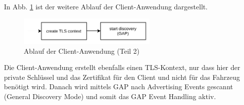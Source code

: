 \\\\
In Abb. \ref{fig: impl ablauf anwendung client teil 2} ist der weitere Ablauf der Client-Anwendung dargestellt.
\begin{figure}[H]
    \centering
    \includegraphics[width=0.6\textwidth]{graphics/ablauf_anwendung_teil_2_client.pdf}
    \caption[Ablauf der Client-Anwendung (Teil 2)]{Ablauf der Client-Anwendung (Teil 2)}
    \label{fig: impl ablauf anwendung client teil 2}
\end{figure}
Die Client-Anwendung erstellt ebenfalls einen TLS-Kontext, nur dass hier der private Schlüssel und das Zertifikat für den Client und nicht für das Fahrzeug benötigt wird. Danach wird mittels GAP nach Advertising Events gescannt (General Discovery Mode) und somit das GAP Event Handling aktiv.
\\\\
